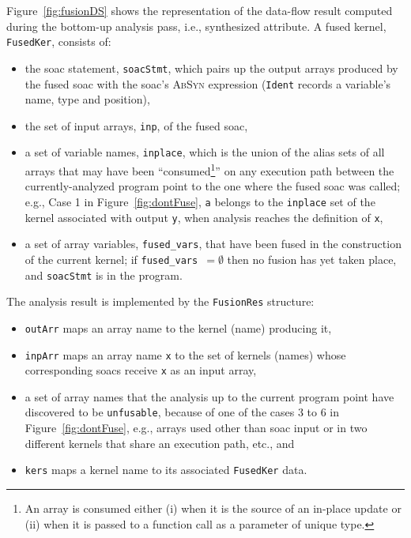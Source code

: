\documentclass{sigplanconf}  %
\newcommand{\emp}[1]{\textcolor{DikuRed}{ #1}}
\begin{document}

Figure~\ref{fig:fusionDS} shows the representation of the data-flow result
computed during the bottom-up analysis pass, i.e., synthesized attribute.  
A fused kernel, \emp{\tt FusedKer}, consists of:
\begin{itemize}
    \item the {\sc soac} statement, {\tt soacStmt}, which pairs up
            the output arrays produced by the fused {\sc soac} 
            with the {\sc soac}'s \textsc{AbSyn} expression 
            ({\tt Ident} records a variable's name, type and position), 
    \item the set of input arrays, {\tt inp}, of the fused {\sc soac},
    \item a set of variable names, {\tt inplace}, which is
            the union of the alias sets of all arrays that may have 
            been ``consumed\footnote{
                An array is consumed either (i) when it is the 
                source of an in-place update or (ii) when it is passed 
                to a function call as a parameter of unique type. 
            }''
            on any execution path between the currently-analyzed program 
            point to the one where the fused {\sc soac} was called; e.g.,
            \emp{Case 1} in Figure~\ref{fig:dontFuse}, {\tt a}
            belongs to the {\tt inplace} set of the kernel associated
            with output {\tt y}, when analysis reaches 
            the definition of {\tt x},
    \item a set of array variables, {\tt fused\_vars}, that have been 
            fused in the construction of the current kernel;
            if {\tt fused\_vars $=\emptyset$} then no fusion has
            yet taken place, and {\tt soacStmt} is in the program.       
\end{itemize}

The analysis result is implemented by the \emp{\tt FusionRes} structure: 
\begin{itemize}
    \item {\tt outArr} maps an array name to the kernel (name) producing it, 
    \item {\tt inpArr} maps an array name {\tt x} to the set of kernels (names) 
            whose corresponding {\sc soac}s receive {\tt x} as an input array,
    \item a set of array names that the analysis up to the current 
            program point have discovered to be {\tt unfusable}, because
            of one of the \emp{cases 3 to 6} in Figure~\ref{fig:dontFuse},
            e.g., arrays used other than {\sc soac} input or
            in two different kernels that share an execution path, etc., and
    \item {\tt kers} maps a kernel name to its associated \emp{\tt FusedKer} data.
\end{itemize}
\end{document}
